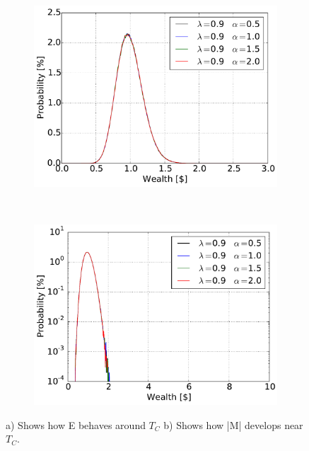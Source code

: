 \begin{figure}[H]
    \centering
    \begin{subfigure}{0.5\textwidth}
        \centering
        \includegraphics[width=\linewidth]{result/bilder/5d-90}
        \caption{}
    \end{subfigure}%
    ~ 
    \begin{subfigure}{0.5\textwidth}
        \centering
        \includegraphics[width=\linewidth]{result/bilder/5d-90-log}
        \caption{}
    \end{subfigure}
    \caption{a) Shows how E behaves around $T_C$ b) Shows how |M| develops near $T_C$.}
    \label{fig:5d-90}
\end{figure}
























